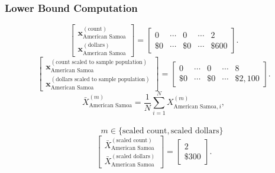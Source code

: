 \subsubsection{Lower Bound Computation}
\[
\begin{bmatrix}
\mathbf{x}_{\text{American Samoa}}^{(\text{count})}\\
\mathbf{x}_{\text{American Samoa}}^{(\text{dollars})}
\end{bmatrix}
=
\begin{bmatrix}
0 & \cdots & 0 & \cdots & 2\\
\$0 & \cdots & \$0 & \cdots & \$600
\end{bmatrix}.
\]
\[
\begin{bmatrix}
\mathbf{x}_{\text{American Samoa}}^{(\text{count scaled to sample population})}\\
\mathbf{x}_{\text{American Samoa}}^{(\text{dollars scaled to sample population})}
\end{bmatrix}
=
\begin{bmatrix}
0 & \cdots & 0 & \cdots & 8\\
\$0 & \cdots & \$0 & \cdots & \$2{,}100
\end{bmatrix}.
\]
  \[
\bar{X}_{\text{American Samoa}}^{(m)}
= \frac{1}{N}\sum_{i=1}^{N} X_{\text{American Samoa},i}^{(m)},
\]
\\
\[
\qquad
m \in \{\text{scaled count},\text{scaled dollars}\}
\]
\[
\begin{bmatrix}
\bar{X}_{\text{American Samoa}}^{(\text{scaled count})}\\
\bar{X}_{\text{American Samoa}}^{(\text{scaled dollars})}
\end{bmatrix}
=
\begin{bmatrix}
2\\
\$300
\end{bmatrix}.
\]
